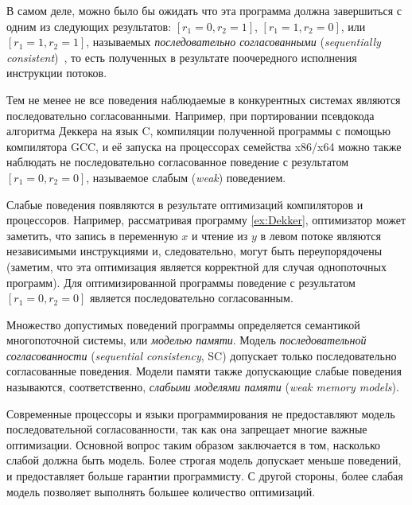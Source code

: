 В самом деле, можно было бы ожидать что эта программа 
должна завершиться с одним из следующих результатов: 
${[r_1=0, r_2=1]}$, ${[r_1=1,r_2=0]}$, или ${[r_1=1,r_2=1]}$,
называемых \emph{последовательно согласованными} 
(\emph{sequentially consistent})~\cite{Lamport:TC79},
то есть полученных в результате поочередного 
исполнения инструкции потоков. 



Тем не менее не все поведения наблюдаемые в
конкурентных системах являются последовательно согласованными.
Например, при портировании псевдокода алгоритма Деккера
на язык C, компиляции полученной программы с помощью компилятора GCC, 
и её запуска на процессорах семейства x86/x64
можно также наблюдать не последовательно согласованное поведение
с результатом $[r_1=0, r_2=0]$, называемое слабым (\emph{weak}) поведением.

Слабые поведения появляются в результате оптимизаций 
компиляторов и процессоров. Например, 
рассматривая программу \ref{ex:Dekker}, 
оптимизатор может заметить, что запись в переменную $x$
и чтение из $y$ в левом потоке являются независимыми инструкциями 
и, следовательно, могут быть переупорядочены
(заметим, что эта оптимизация является корректной 
для случая однопоточных программ).
Для оптимизированной программы поведение с результатом
$[r_1=0, r_2=0]$ является последовательно согласованным.

Множество допустимых поведений программы определяется
семантикой многопоточной системы, или \emph{моделью памяти}.
Модель \emph{последовательной согласованности}
(\emph{sequential consistency}, SC) допускает 
только последовательно согласованные поведения.
Модели памяти также допускающие слабые поведения 
называются, соответственно, \emph{слабыми моделями памяти}
(\emph{weak memory models}).

Современные процессоры и языки программирования 
не предоставляют модель последовательной согласованности, 
так как она запрещает многие важные оптимизации.
Основной вопрос таким образом заключается в том, насколько слабой 
должна быть модель. Более строгая модель допускает меньше поведений, 
и предоставляет больше гарантии программисту.
С другой стороны, более слабая модель позволяет
выполнять большее количество оптимизаций.

